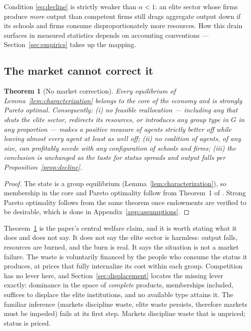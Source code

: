 \documentclass[12pt,letterpaper]{article}
\newtheorem{theorem}{Theorem}
\theoremstyle{definition}
\begin{document}
Condition \eqref{eq:decline} is strictly weaker than $\alpha<1$: an elite sector whose firms produce \emph{more} output than competent firms still drags aggregate output down if its schools and firms consume disproportionately more resources.
How this drain surfaces in measured statistics depends on accounting conventions --- Section~\ref{sec:empirics} takes up the mapping.

\subsection{The market cannot correct it}

\begin{theorem}[No market correction]\label{thm:nocorrection} Every equilibrium of Lemma~\ref{lem:characterization} belongs to the core of the economy and is strongly Pareto optimal.
Consequently: (i) no feasible reallocation --- including any that shuts the elite sector, redirects its resources, or introduces any group type in $G$ in any proportion --- makes a positive measure of agents strictly better off while leaving almost every agent at least as well off; (ii) no coalition of agents, of any size, can profitably secede with any configuration of schools and firms; (iii) the conclusion is unchanged as the taste for status spreads and output falls per Proposition~\ref{prop:decline}.
\end{theorem}

\begin{proof}
The state is a group equilibrium (Lemma~\ref{lem:characterization}), so membership in the core and Pareto optimality follow from Theorem~1 of \citet{ellickson2006organization}.
Strong Pareto optimality follows from the same theorem once endowments are verified to be desirable, which is done in Appendix~\ref{app:assumptions}.
\end{proof}

Theorem~\ref{thm:nocorrection} is the paper's central welfare claim, and it is worth stating what it does and does not say.
It does not say the elite sector is harmless: output falls, resources are burned, and the burn is real.
It says the situation is not a market failure.
The waste is voluntarily financed by the people who consume the status it produces, at prices that fully internalize its cost within each group.
Competition has no lever here, and Section~\ref{sec:displacement} locates the missing lever exactly: dominance in the space of \emph{complete} products, memberships included, suffices to displace the elite institutions, and no available type attains it.
The familiar inference (markets discipline waste, elite waste persists, therefore markets must be impeded) fails at its first step.
Markets discipline waste that is unpriced; status is priced.
\end{document}

